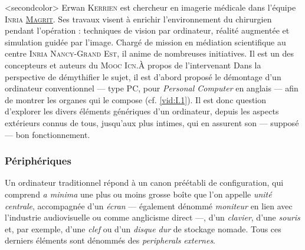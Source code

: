 \caution[t]<secondcolor>{%
Erwan \textsc{Kerrien} est chercheur en imagerie médicale dans l’équipe \textsc{Inria} \href{https://www.inria.fr/equipes/magrit}{\textsc{Magrit}}. Ses travaux visent à enrichir l'environnement du chirurgien pendant l'opération : techniques de vision par ordinateur, réalité augmentée et simulation guidée par l'image. Chargé de mission en médiation scientifique au centre \textsc{Inria} \textsc{Nancy-Grand Est}, il anime de nombreuses initiatives. Il est un des concepteurs et auteurs du \textsc{Mooc} \textsc{Icn}.}{À propos de l'intervenant}
Dans la perspective de démythifier le sujet, il est d'abord proposé le démontage d'un ordinateur conventionnel 
--- type PC, pour \textit{Personal Computer} en anglais --- afin de montrer les organes qui le compose (cf. \cref{vid:I.1}).
Il est donc question d'explorer les divers éléments génériques d'un ordinateur, depuis les aspects extérieurs connus de tous, jusqu'aux plus intimes, qui en assurent son --- supposé --- bon fonctionnement.	

\subsubsection[Périphériques]{Périphériques}
\label{subsub:I.1.1.1}

Un ordinateur traditionnel répond à un canon préétabli de configuration, qui comprend \textit{a minima} une plus ou moins grosse boîte que l'on appelle \emph{unité centrale}, accompagnée d'un \emph{écran} --- également dénommé \emph{moniteur} en lien avec l'industrie audiovisuelle ou comme anglicisme direct ---, d'un \emph{clavier}, d'une \emph{souris} et, par exemple, d'une \emph{clef} ou d'un \emph{disque dur} de stockage nomade. Tous ces derniers éléments sont dénommés des \emph{\glspl{peripheral}} \emph{externes}.

